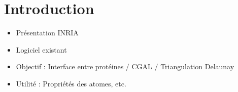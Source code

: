 \chapter*{Introduction}

\begin{itemize}
  \item Présentation INRIA
  \item Logiciel existant
  \item Objectif : Interface entre protéines / CGAL / Triangulation Delaunay
  \item Utilité : Propriétés des atomes, etc.
\end{itemize}
